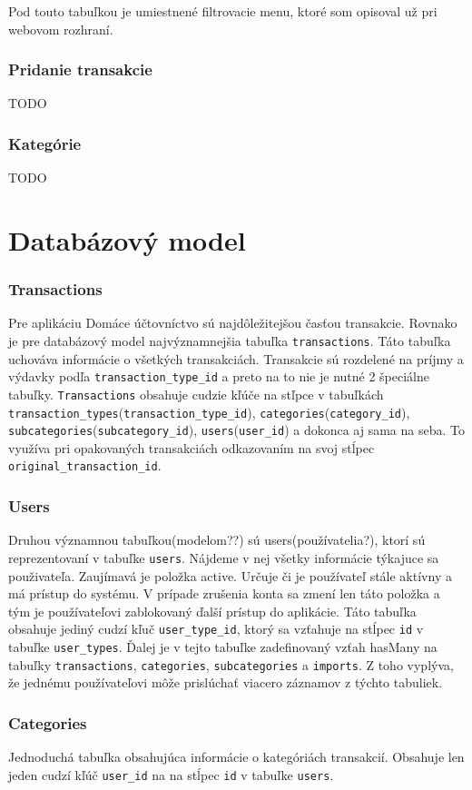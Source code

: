 \documentclass[12pt,onesided]{book}
\begin{document}
Pod touto tabuľkou je umiestnené filtrovacie menu, ktoré som opisoval už pri webovom rozhraní.
\subsubsection{Pridanie transakcie}
TODO
\subsubsection{Kategórie}
TODO


\section{Databázový model}
\subsubsection{Transactions}
Pre aplikáciu Domáce účtovníctvo sú najdôležitejšou časťou transakcie. Rovnako je pre databázový model najvýznamnejšia tabuľka \texttt{transactions}. Táto tabuľka uchováva informácie o všetkých transakciách. Transakcie sú rozdelené na príjmy a výdavky podľa \texttt{transaction\_type\_id} a preto na to nie je nutné 2 špeciálne tabuľky. \texttt{Transactions} obsahuje cudzie kľúče na stľpce v tabuľkách \texttt{transaction\_types}(\texttt{transaction\_\allowbreak type\_\allowbreak id}), \texttt{categories}(\texttt{category\_id}), \texttt{subcategories}(\texttt{subcategory\_id}), \texttt{users}(\texttt{user\_id}) a dokonca aj sama na seba. To využíva pri opakovaných transakciách odkazovaním na svoj stĺpec \texttt{original\_transaction\_id}.
\subsubsection{Users}
Druhou významnou tabuľkou(modelom??) sú users(používatelia?), ktorí sú reprezentovaní v tabuľke \texttt{users}. Nájdeme v nej všetky informácie týkajuce sa použivateľa. Zaujímavá je položka active. Určuje či je používateľ stále aktívny a má prístup do systému. V prípade zrušenia konta sa zmení len táto položka a tým je používateľovi zablokovaný ďalší prístup do aplikácie. Táto tabuľka obsahuje jediný cudzí kľuč \texttt{user\_type\_id}, ktorý sa vzťahuje na stĺpec \texttt{id} v tabuľke \texttt{user\_types}. Ďalej je v tejto tabuľke zadefinovaný vzťah hasMany na tabuľky \texttt{transactions}, \texttt{categories}, \texttt{subcategories} a \texttt{imports}. Z toho vyplýva, že jednému používateľovi môže prislúchať viacero záznamov z týchto tabuliek.
\subsubsection{Categories}
Jednoduchá tabuľka obsahujúca informácie o kategóriách transakcií. Obsahuje len jeden cudzí kľúč \texttt{user\_id} na na stĺpec \texttt{id} v tabuľke \texttt{users}. 
\end{document}
